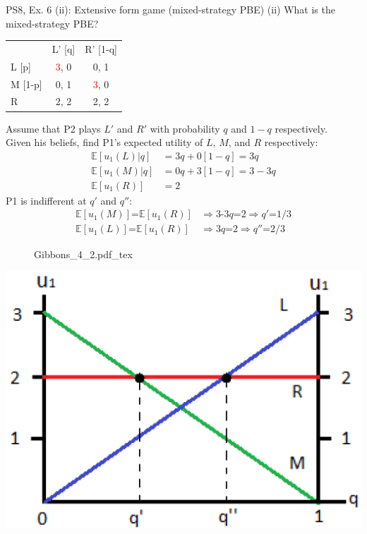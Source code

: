 \begin{frame}{PS8, Ex. 6 (ii): Extensive form game (mixed-strategy PBE)}
    (ii) What is the mixed-strategy PBE? \vspace{-8pt}
    \begin{multicols}{2}
      \begin{table}
        \begin{tabular}{l|c|c|}
          \multicolumn{1}{c}{} & \multicolumn{1}{c}{L' [q]} & \multicolumn{1}{c}{R' [1-q]} \\\cline{2-3}
          L [p]   & \textcolor{red}{3}, 0 & 0, \color{blue}1 \\\cline{2-3}
          M [1-p] & 0, \color{blue}1 & \textcolor{red}{3}, 0 \\\cline{2-3}
          R       & 2, \color{blue}2 & 2, \color{blue}2 \\\cline{2-3}
        \end{tabular}
      \end{table} \vspace{-4pt}
      Assume that P2 plays $L'$ and $R'$ with probability $q$ and $1-q$ respectively.\\\smallskip
      Given his beliefs, find P1's expected utility of $L$, $M$, and $R$ respectively: \vspace{-4pt}
      \begin{align*}
        \mathbb{E}[u_1(L)|q]&=3q+0[1-q]=3q\\
        \mathbb{E}[u_1(M)|q]&=0q+3[1-q]=3-3q\\
        \mathbb{E}[u_1(R)]&=2
      \end{align*}
      P1 is indifferent at $q'$ and $q''$: \vspace{-6pt}
      \begin{align*}
        \mathbb{E}[u_1(M)]\text{=}\mathbb{E}[u_1(R)]&\Rightarrow \text{3-3}q\text{=}2\Rightarrow q'\text{=}1/3\\
        \mathbb{E}[u_1(L)]\text{=}\mathbb{E}[u_1(R)]&\Rightarrow 3q\text{=}2\Rightarrow q''\text{=}2/3
      \end{align*}
      \vfill\null\columnbreak
      \begin{figure}[!h]
        \center {}
        {Gibbons_4_2.pdf_tex}
      \end{figure}
      \includegraphics[width=1.1\columnwidth]{figures/Gibbons_4_2_E[u]}

\end{multicols}
\end{frame}
